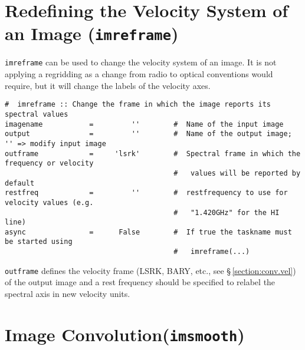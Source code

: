 \section{Redefining the Velocity System of an Image ({\tt imreframe})}
\label{section:analysis.reframe}

{\tt imreframe} can be used to change the velocity system of an
image. It is not applying a regridding as a change from radio to
optical conventions would require, but it will change the labels of the
velocity axes. 

\small
\begin{verbatim}
#  imreframe :: Change the frame in which the image reports its spectral values
imagename           =         ''        #  Name of the input image
output              =         ''        #  Name of the output image; '' => modify input image
outframe            =     'lsrk'        #  Spectral frame in which the frequency or velocity
                                        #   values will be reported by default
restfreq            =         ''        #  restfrequency to use for velocity values (e.g.
                                        #   "1.420GHz" for the HI line)
async               =      False        #  If true the taskname must be started using
                                        #   imreframe(...)
\end{verbatim}
\normalsize

{\tt outframe} defines the velocity frame  (LSRK, BARY, etc., see
\S\,\ref{section:conv.vel}) of the output image and a rest frequency
should be specified to relabel the spectral axis in new velocity units. 


\section{Image Convolution({\tt imsmooth})}
\label{section:analysis.imsmooth}

